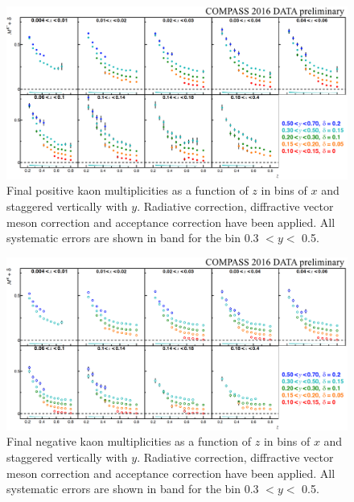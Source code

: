 \documentclass[letterpaper,12pt]{article}
\begin{document}
\begin{figure}
	\centering
	\includegraphics[scale=0.5]{./gfx/Kp.png}
	\caption{Final positive kaon multiplicities as a function of $z$ in bins of $x$ and staggered vertically with $y$. Radiative correction, diffractive vector meson correction and acceptance correction have been applied. All systematic errors are shown in band for the bin 0.3 $< y <$ 0.5.}
	\label{Kp}
\end{figure}

\begin{figure}
	\centering
	\includegraphics[scale=0.5]{./gfx/Km.png}
	\caption{Final negative kaon multiplicities as a function of $z$ in bins of $x$ and staggered vertically with $y$. Radiative correction, diffractive vector meson correction and acceptance correction have been applied. All systematic errors are shown in band for the bin 0.3 $< y <$ 0.5.}
	\label{Km}
\end{figure}

\newpage
\end{document}
